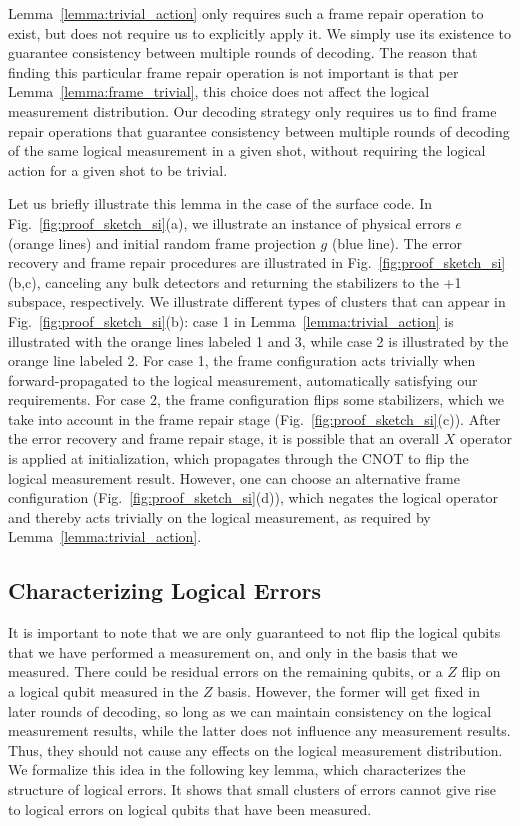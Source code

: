 Lemma~\ref{lemma:trivial_action} only requires such a frame repair operation to exist, but does not require us to explicitly apply it.
%
We simply use its existence to guarantee consistency between multiple rounds of decoding.
%
The reason that finding this particular frame repair operation is not important is that per Lemma~\ref{lemma:frame_trivial}, this choice does not affect the logical measurement distribution.
%
Our decoding strategy only requires us to find frame repair operations that guarantee consistency between multiple rounds of decoding of the same logical measurement in a given shot, without requiring the logical action for a given shot to be trivial.

Let us briefly illustrate this lemma in the case of the surface code.
%
In Fig.~\ref{fig:proof_sketch_si}(a), we illustrate an instance of physical errors $e$ (orange lines) and initial random frame projection $g$ (blue line).
%
The error recovery and frame repair procedures are illustrated in Fig.~\ref{fig:proof_sketch_si}(b,c), canceling any bulk detectors and returning the stabilizers to the +1 subspace, respectively.
%
We illustrate different types of clusters that can appear in Fig.~\ref{fig:proof_sketch_si}(b): case 1 in Lemma~\ref{lemma:trivial_action} is illustrated with the orange lines labeled 1 and 3, while case 2 is illustrated by the orange line labeled 2.
%
For case 1, the frame configuration acts trivially when forward-propagated to the logical measurement, automatically satisfying our requirements.
%
For case 2, the frame configuration flips some stabilizers, which we take into account in the frame repair stage (Fig.~\ref{fig:proof_sketch_si}(c)).
%
After the error recovery and frame repair stage, it is possible that an overall $X$ operator is applied at initialization, which propagates through the CNOT to flip the logical measurement result.
%
However, one can choose an alternative frame configuration (Fig.~\ref{fig:proof_sketch_si}(d)), which negates the logical operator and thereby acts trivially on the logical measurement, as required by Lemma~\ref{lemma:trivial_action}.


\subsection{Characterizing Logical Errors}
\label{si_sec:logical_error}

It is important to note that we are only guaranteed to not flip the logical qubits that we have performed a measurement on, and only in the basis that we measured.
%
There could be residual errors on the remaining qubits, or a $Z$ flip on a logical qubit measured in the $Z$ basis.
%
However, the former will get fixed in later rounds of decoding, so long as we can maintain consistency on the logical measurement results, while the latter does not influence any measurement results.
%
Thus, they should not cause any effects on the logical measurement distribution.
%
We formalize this idea in the following key lemma, which characterizes the structure of logical errors.
%
It shows that small clusters of errors cannot give rise to logical errors on logical qubits that have been measured.

